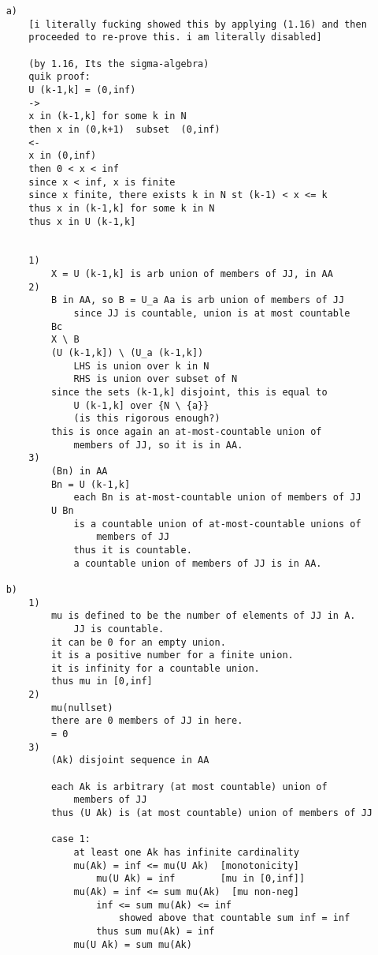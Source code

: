 \documentclass{article}
\begin{document}
\begin{flushleft}
\begin{verbatim}
    a)
        [i literally fucking showed this by applying (1.16) and then 
        proceeded to re-prove this. i am literally disabled]

        (by 1.16, Its the sigma-algebra)
        quik proof: 
        U (k-1,k] = (0,inf)
        ->
        x in (k-1,k] for some k in N 
        then x in (0,k+1)  subset  (0,inf)
        <- 
        x in (0,inf)
        then 0 < x < inf 
        since x < inf, x is finite 
        since x finite, there exists k in N st (k-1) < x <= k
        thus x in (k-1,k] for some k in N 
        thus x in U (k-1,k]


        1)
            X = U (k-1,k] is arb union of members of JJ, in AA 
        2)
            B in AA, so B = U_a Aa is arb union of members of JJ 
                since JJ is countable, union is at most countable
            Bc
            X \ B 
            (U (k-1,k]) \ (U_a (k-1,k])
                LHS is union over k in N 
                RHS is union over subset of N 
            since the sets (k-1,k] disjoint, this is equal to 
                U (k-1,k] over {N \ {a}}
                (is this rigorous enough?)
            this is once again an at-most-countable union of 
                members of JJ, so it is in AA. 
        3)
            (Bn) in AA 
            Bn = U (k-1,k]
                each Bn is at-most-countable union of members of JJ 
            U Bn 
                is a countable union of at-most-countable unions of 
                    members of JJ
                thus it is countable. 
                a countable union of members of JJ is in AA. 

    b)
        1)
            mu is defined to be the number of elements of JJ in A. 
                JJ is countable.
            it can be 0 for an empty union. 
            it is a positive number for a finite union. 
            it is infinity for a countable union. 
            thus mu in [0,inf]
        2)
            mu(nullset) 
            there are 0 members of JJ in here. 
            = 0
        3)
            (Ak) disjoint sequence in AA
            
            each Ak is arbitrary (at most countable) union of 
                members of JJ 
            thus (U Ak) is (at most countable) union of members of JJ 

            case 1:
                at least one Ak has infinite cardinality 
                mu(Ak) = inf <= mu(U Ak)  [monotonicity]
                    mu(U Ak) = inf        [mu in [0,inf]] 
                mu(Ak) = inf <= sum mu(Ak)  [mu non-neg]
                    inf <= sum mu(Ak) <= inf 
                        showed above that countable sum inf = inf 
                    thus sum mu(Ak) = inf 
                mu(U Ak) = sum mu(Ak)


\end{verbatim}
\end{flushleft}
\end{document}

